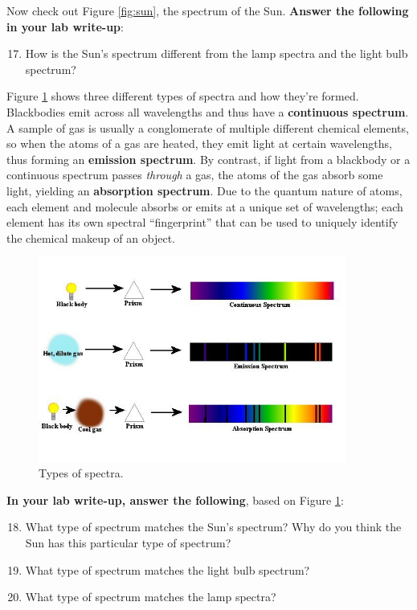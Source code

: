 \documentclass[11pt]{article}
\begin{document}
\noindent
Now check out Figure \ref{fig:sun}, the spectrum of the Sun. \textbf{Answer the following in your lab write-up}:
\begin{enumerate}
    \setcounter{enumi}{16}
    \item How is the Sun's spectrum different from the lamp spectra and the light bulb spectrum?
\end{enumerate}

\bigskip

Figure \ref{fig:types} shows three different types of spectra and how they're formed. Blackbodies emit across all wavelengths and thus have a \textbf{continuous spectrum}. A sample of gas is usually a conglomerate of multiple different chemical elements, so when the atoms of a gas are heated, they emit light at certain wavelengths, thus forming an \textbf{emission spectrum}. By contrast, if light from a blackbody or a continuous spectrum passes \emph{through} a gas, the atoms of the gas absorb some light, yielding an \textbf{absorption spectrum}. Due to the quantum nature of atoms, each element and molecule absorbs or emits at a unique set of wavelengths; each element has its own spectral ``fingerprint'' that can be used to uniquely identify the chemical makeup of an object.

\begin{figure}[h!]
    \centering
    \includegraphics[width=0.9\textwidth,trim={0cm 2cm 0cm 1cm},clip]{Images/emission_v_absorption.jpg}
    \caption{Types of spectra.}
    \label{fig:types}
\end{figure}

\medskip 
\textbf{In your lab write-up, answer the following}, based on Figure \ref{fig:types}:
\begin{enumerate}
    \setcounter{enumi}{17}
    
    \item What type of spectrum matches the Sun's spectrum? Why do you think the Sun has this particular type of spectrum?
    
    \item What type of spectrum matches the light bulb spectrum?
    
    \item What type of spectrum matches the lamp spectra?
\end{enumerate}
\end{document}

